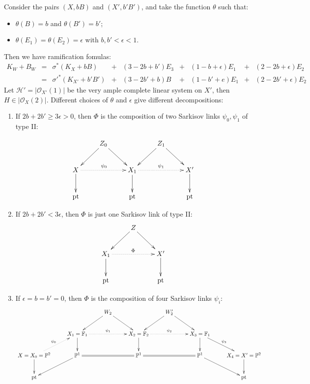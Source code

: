 \documentclass[11pt]{amsart}
\begin{document}
Consider the pairs $ (X,bB) $ and $ (X',b'B') $, and take the function $\theta$ such that:
\begin{itemize}
  \item $\theta(B)=b$ and $\theta(B')=b'$;
  \item $\theta(E_{1})=\theta(E_{2})=\epsilon$ with $b,b'<\epsilon<1$. 
\end{itemize}
Then we have ramification fomulas:
\[ \begin{array}{rllllllllll}
  K_W+B_W&=&\sigma^*(K_X+bB)&+& (3-2b+b')E_3&+&(1-b+\epsilon)E_1&+&(2-2b+\epsilon)E_2&\\
  &=&\sigma'^*(K_{X'}+b'B')&+&(3-2b'+b)B&+&(1-b'+e)E_1&+&(2-2b'+\epsilon)E_2&
\end{array} \]
Let $ \mathcal{H}'=|\mathcal{O}_{X'}(1)| $ be the very ample complete linear system on $X'$, then $H\in |\mathcal{O}_{X}(2)|$. Different choices of $\theta$ and  $\epsilon$ give different decompositions: 
\begin{enumerate}
  \item\label{example1.1} If $ 2b+2b'\geqslant 3\epsilon>0 $, then $\Phi$ is the composition of two Sarkisov links $\psi_{0},\psi_{1}$ of type II:

    \[
      \xymatrix{
    &Z_{0}\ar[rd]\ar[ld] & &Z_{1}\ar[rd]\ar[ld]\\
        X\ar[d]\ar@{.>}[rr]^{\psi_{0}}& &X_{1}\ar@{.>}[rr]^{\psi_{1}}\ar[d]&&X'\ar[d]\\
        \text{pt}&&\text{pt}&&\text{pt}
      }
    \]
  \item If $ 2b+2b'< 3\epsilon $, then $\Phi$ is just one Sarkisov link  of type II:
    \[
      \xymatrix{
    &Z\ar[rd]\ar[ld] & \\
        X_{1}\ar@{.>}[rr]^{\Phi}\ar[d]& &X'\ar[d]\\
        \text{pt}&&\text{pt}
      }
    \]
  \item If $ \epsilon=b=b'=0 $, then $\Phi$ is the composition of four Sarkisov links $\psi_{i}$:
\[ \xymatrix{
&&W_2\ar[ld]\ar[rd]&&W_2'\ar[ld]\ar[rd]\\
&X_1=\mathbb{F}_1\ar@{.>}[rr]^{\psi_{1}}\ar[d]&&X_2=\mathbb{F}_2\ar@{.>}[rr]^{\psi_{2}}\ar[d]&&X_3=\mathbb{F}_1\ar[d]\ar[rd]^{\psi_{3}}\\
X=X_0=\mathbb{P}^2\ar[d]\ar@{.>}[ru]^{\psi_{0}}&\mathbb{P}^1\ar[ld]\ar@{=}[rr]&&\mathbb{P}^1\ar@{=}[rr]&&\mathbb{P}^1\ar[rd]&X_4=X'=\mathbb{P}^2\ar[d]\\
\text{pt}&&&&&&\text{pt} } \]
\end{enumerate}
\end{document}
